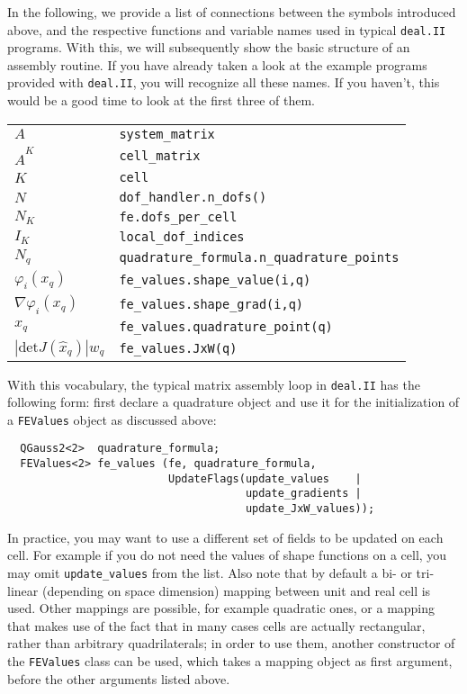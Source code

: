 \documentclass{article}
\begin{document}
In the following, we provide a list of connections between the symbols introduced
above, and the respective functions and variable names used in typical
\texttt{deal.II} programs. With this, we will subsequently show the basic
structure of an assembly routine. If you have already taken a look at the
example programs provided with \texttt{deal.II}, you will recognize all these
names. If you haven't, this would be a good time to look at the first
three of them.


\begin{center}
  \begin{tabular}{|ll|}
    \hline
    $A$ & \texttt{system\_matrix} \\
    $\hat A^K$ & \texttt{cell\_matrix} \\
    $K$ & \texttt{cell} \\
    $N$ & \texttt{dof\_handler.n\_dofs()} \\
    $N_K$ & \texttt{fe.dofs\_per\_cell} \\
    $I_K$ & \texttt{local\_dof\_indices} \\
    $N_q$ & \texttt{quadrature\_formula.n\_quadrature\_points} \\
    $\varphi_i(x_q)$ & \texttt{fe\_values.shape\_value(i,q)} \\
    $\nabla\varphi_i(x_q)$ & \texttt{fe\_values.shape\_grad(i,q)} \\
    $x_q$ & \texttt{fe\_values.quadrature\_point(q)} \\
    $|\text{det} J(\hat x_q)| w_q$ & \texttt{fe\_values.JxW(q)} \\
    \hline
  \end{tabular}  
\end{center}

With this vocabulary, the typical matrix assembly loop in \texttt{deal.II} has
the following form: first declare a quadrature object and use it for the
initialization of a \texttt{FEValues} object as discussed above:
\begin{verbatim}
  QGauss2<2>  quadrature_formula;
  FEValues<2> fe_values (fe, quadrature_formula, 
                         UpdateFlags(update_values    |
                                     update_gradients |
                                     update_JxW_values));
\end{verbatim}
In practice, you may want to use a different set of fields to be updated on
each cell. For example if you do not need the values of shape functions on a
cell, you may omit \texttt{update\_values} from the list. Also note that by
default a bi- or tri-linear (depending on space dimension) mapping between
unit and real cell is used. Other mappings are possible, for example quadratic
ones, or a mapping that makes use of the fact that in many cases cells are
actually rectangular, rather than arbitrary quadrilaterals; in order to use
them, another constructor of the \texttt{FEValues} class can be used, which
takes a mapping object as first argument, before the other arguments listed
above.
\end{document}
